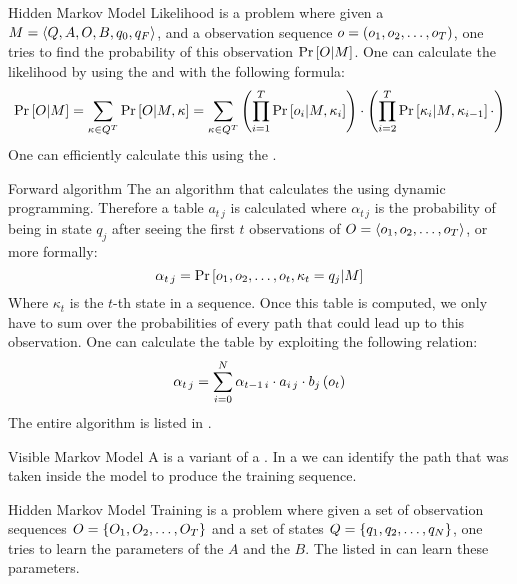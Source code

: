\begin{df}{Hidden Markov Model Likelihood}
\sb{} is a problem where given a  $M=\left\langle Q,A,O,B,q_0,q_F\right\rangle$, and a observation sequence $o=\left(o_1,o_2,\ldots,o_T\right)$, one tries to find the probability of this observation $\Pr\left[O|M\right]$. One can calculate the likelihood by using the  and  with the following formula:
\begin{equation}
\Pr\left[O|M\right]=\displaystyle\sum_{\kappa\in Q^T}\Pr\left[O|M,\kappa\right]=\displaystyle\sum_{\kappa\in Q^T}\left(\displaystyle\prod_{i=1}^T\Pr\left[o_i|M,\kappa_i\right]\right)\cdot\left(\displaystyle\prod_{i=2}^T\Pr\left[\kappa_i|M,\kappa_{i-1}\right]\cdot\right)
\end{equation}
One can efficiently calculate this using the .
\end{df}
\begin{df}{Forward algorithm}
The \sb{} an algorithm that calculates the  using dynamic programming. Therefore a table $a_{t\,j}$ is calculated where $\alpha_{t\,j}$ is the probability of being in state $q_j$ after seeing the first $t$ observations of $O=\left\langle o_1,o_2,\ldots,o_T\right\rangle$, or more formally:
\begin{equation}
\alpha_{t\,j}=\Pr\left[o_1,o_2,\ldots,o_t,\kappa_t=q_j|M\right]
\end{equation}
Where $\kappa_t$ is the $t$-th state in a sequence. Once this table is computed, we only have to sum over the probabilities of every path that could lead up to this observation. One can calculate the table by exploiting the following relation:
\begin{equation}
\alpha_{t\,j}=\displaystyle\sum_{i=0}^N\alpha_{t-1\,i}\cdot a_{i\,j}\cdot b_{j}\left(o_t\right)
\end{equation}
The entire algorithm is listed in .
\end{df}
\begin{df}{Visible Markov Model}
A \sb{} is a variant of a . In a \sb{} we can identify the path that was taken inside the model to produce the training sequence.
\end{df}
\begin{df}{Hidden Markov Model Training}
\sb{} is a problem where given a set of observation sequences $O=\left\{O_1,O_2,\ldots,O_T\right\}$ and a set of states $Q=\left\{q_1,q_2,\ldots,q_N\right\}$, one tries to learn the parameters of the  $A$ and the  $B$. The  listed in  can learn these parameters.
\end{df}
